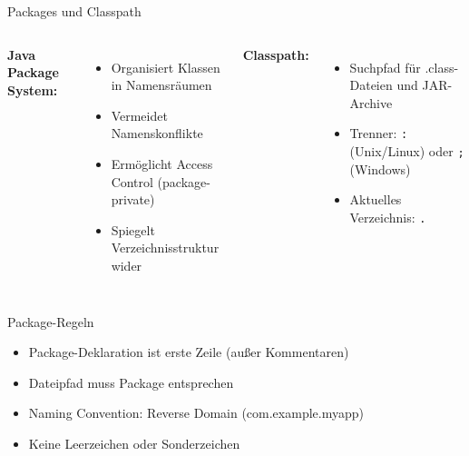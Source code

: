 \begin{frame}{Packages und Classpath}
  \begin{columns}[T]
    \textbf{Java Package System:}
    \begin{itemize}
      \item Organisiert Klassen in Namensräumen
      \item Vermeidet Namenskonflikte
      \item Ermöglicht Access Control (package-private)
      \item Spiegelt Verzeichnisstruktur wider
    \end{itemize}

    \textbf{Classpath:}
    \begin{itemize}
      \item Suchpfad für .class-Dateien und JAR-Archive
      \item Trenner: \texttt{:} (Unix/Linux) oder \texttt{;} (Windows)
      \item Aktuelles Verzeichnis: \texttt{.}
    \end{itemize}
  \end{columns}

  \begin{exampleblock}{Package-Regeln}
    \begin{itemize}
      \item Package-Deklaration ist erste Zeile (außer Kommentaren)
      \item Dateipfad muss Package entsprechen
      \item Naming Convention: Reverse Domain (com.example.myapp)
      \item Keine Leerzeichen oder Sonderzeichen
    \end{itemize}
  \end{exampleblock}
\end{frame}

